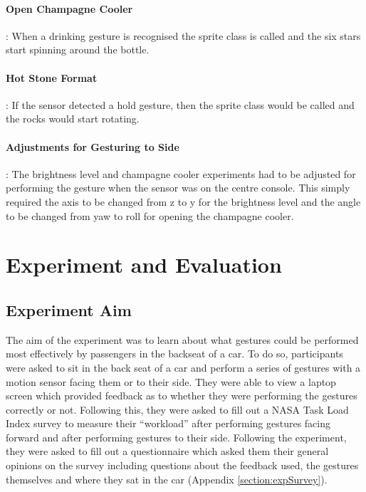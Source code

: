 \documentclass{l4proj}
\begin{document}
\subsubsection{Open Champagne Cooler}: When a drinking gesture is recognised the sprite class is called and the six stars start spinning around the bottle.

\subsubsection{Hot Stone Format}: If the sensor detected a hold gesture, then the sprite class would be called and the rocks would start rotating.

\subsubsection{Adjustments for Gesturing to Side}: The brightness level and champagne cooler experiments had to be adjusted for performing the gesture when the sensor was on the centre console. This simply required the axis to be changed from z to y for the brightness level and the angle to be changed from yaw to roll for opening the champagne cooler.

\chapter{Experiment and Evaluation}
\section{Experiment Aim}
The aim of the experiment was to learn about what gestures could be performed most effectively by passengers in the backseat of a car. To do so, participants were asked to sit in the back seat of a car and perform a series of gestures with a motion sensor facing them or to their side. They were able to view a laptop screen which provided feedback as to whether they were performing the gestures correctly or not. Following this, they were asked to fill out a NASA Task Load Index survey to measure their “workload” after performing gestures facing forward and after performing gestures to their side. Following the experiment, they were asked to fill out a questionnaire which asked them their general opinions on the survey including questions about the feedback used, the gestures themselves and where they sat in the car (Appendix \ref{section:expSurvey}). 
\end{document}
